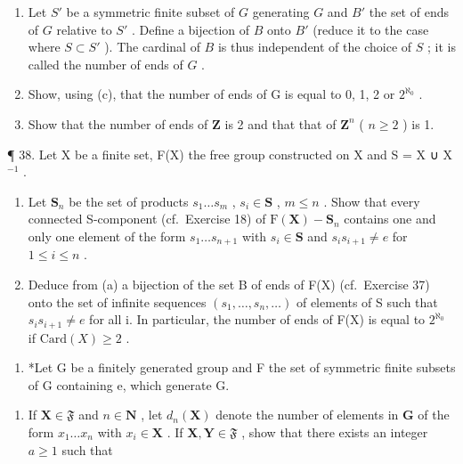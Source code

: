 \begin{enumerate}
\item
  Let \(S'\) be a symmetric finite subset of \(G\) generating \(G\) and \(B'\) the set of ends of \(G\) relative to \(S'\) . Define a bijection of \(B\) onto \(B'\) (reduce it to the case where \(S \subset S'\) ). The cardinal of \(B\) is thus independent of the choice of \(S\) ; it is called the number of ends of \(G\) .
\item
  Show, using (c), that the number of ends of G is equal to 0, 1, 2 or \(2^{\aleph_0}\) .
\item
  Show that the number of ends of \(\mathbf{Z}\) is 2 and that that of \(\mathbf{Z}^n\) ( \(n \geqslant 2\) ) is 1.
\end{enumerate}

¶ 38. Let X be a finite set, F(X) the free group constructed on X and S = X ∪ X \(^{-1}\) .

\begin{enumerate}
\def\labelenumi{(\alph{enumi})}
\item
  Let \(\mathbf{S}_n\) be the set of products \(s_1 \ldots s_m\) , \(s_i \in \mathbf{S}\) , \(m \leqslant n\) . Show that every connected S-component (cf.~Exercise 18) of \(\mathrm{F}(\mathbf{X}) - \mathbf{S}_n\) contains one and only one element of the form \(s_1 \ldots s_{n+1}\) with \(s_i \in \mathbf{S}\) and \(s_i s_{i+1} \neq e\) for \(1 \leqslant i \leqslant n\) .
\item
  Deduce from (a) a bijection of the set B of ends of F(X) (cf.~Exercise 37) onto the set of infinite sequences \((s_{1},\ldots,s_{n},\ldots)\) of elements of S such that \(s_{i}s_{i+1}\neq e\) for all i. In particular, the number of ends of F(X) is equal to \(2^{\aleph_0}\) if \(\text{Card}(X)\geqslant2\) .
\end{enumerate}

\begin{enumerate}
\def\labelenumi{\arabic{enumi}.}
\setcounter{enumi}{38}
\tightlist
\item
  *Let G be a finitely generated group and F the set of symmetric finite subsets of G containing e, which generate G.
\end{enumerate}

\begin{enumerate}
\def\labelenumi{(\alph{enumi})}
\tightlist
\item
  If \(\mathbf{X} \in \mathfrak{F}\) and \(n \in \mathbf{N}\) , let \(d_n(\mathbf{X})\) denote the number of elements in \(\mathbf{G}\) of the form \(x_1 \ldots x_n\) with \(x_i \in \mathbf{X}\) . If \(\mathbf{X}, \mathbf{Y} \in \mathfrak{F}\) , show that there exists an integer \(a \geqslant 1\) such that
\end{enumerate}

